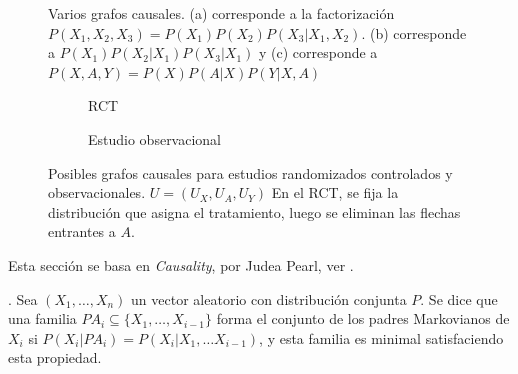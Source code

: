 \begin{figure}[h]
    \label{fig:causal-diagrams}
    \caption{Varios grafos causales.
        (a) corresponde a la factorización
        $P(X_1, X_2, X_3) = P(X_1) P(X_2) P(X_3 | X_1, X_2)$.
        (b) corresponde a
        $P(X_1) P(X_2 | X_1) P(X_3 | X_1)$
        y (c) corresponde a
        $P(X, A, Y) = P(X) P(A | X) P(Y | X, A)$
    }
\end{figure}

\begin{figure}
    \label{fig:causal-diagrams-with-U}
    \begin{subfigure}[b]{0.45\textwidth}
        \centering
        \caption{RCT}
        \label{subfig:cd-rct2}
    \end{subfigure}
    \begin{subfigure}[b]{0.45\textwidth}
        \centering
        \caption{Estudio observacional}
        \label{subfig:observacional2}
    \end{subfigure}

    \caption{Posibles grafos causales para estudios randomizados controlados y observacionales.
    $U = (U_X, U_A, U_Y)$
    En el RCT, se fija la distribución que asigna el tratamiento, luego se eliminan las flechas
    entrantes a $A$.
    }

\end{figure}

Esta sección se basa en \emph{Causality}, por Judea Pearl, ver \cite{pearl2009causality}.

\begin{definicion}\cite[1.2.1]{pearl2009causality}.
    Sea $(X_1, \ldots, X_n)$ un vector aleatorio con distribución conjunta $P$.
    Se dice que una familia $PA_i \subseteq \{X_1, \ldots, X_{i-1}\}$ forma el conjunto
    de los padres Markovianos de
    $X_i$ si $P(X_i | PA_i) = P(X_i | X_1, \ldots X_{i-1})$, y esta familia es minimal
    satisfaciendo esta propiedad.
\end{definicion}

